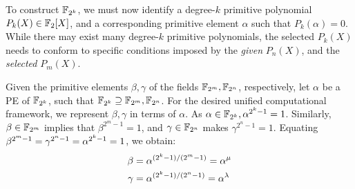 \par To construct ${\mathbb{F}}_{2^k}$, we must now identify
a degree-$k$ primitive polynomial $P_{k}(X)\in{\mathbb{F}}_2[X]$, and a
corresponding primitive element $\alpha$ such that
$P_k(\alpha)=0$. While there may exist many degree-$k$ primitive
polynomials, the selected $P_k(X)$ needs to conform to specific
conditions imposed by the {\it given} $P_n(X)$, and
the {\it selected} $P_m(X)$.





Given the primitive elements $\beta, \gamma$ of the fields 
${\mathbb{F}}_{2^m},{\mathbb{F}}_{2^n}$, respectively, let $\alpha$ be a PE of ${\mathbb{F}}_{2^k}$,
such that ${\mathbb{F}}_{2^k} \supseteq {\mathbb{F}}_{2^m},{\mathbb{F}}_{2^n}$. For the desired unified
computational framework, we represent $\beta, \gamma$ in terms
of $\alpha$. As $\alpha \in {\mathbb{F}}_{2^k}, \alpha^{2^k-1}=1$. Similarly,
$\beta\in {\mathbb{F}}_{2^m}$ implies that $\beta^{2^{m}-1}=1$, and $\gamma\in{\mathbb{F}}_{2^n}$
makes $\gamma^{2^n-1}=1$. Equating
$\beta^{2^m-1}=\gamma^{2^n-1}=\alpha^{2^k-1} = 1$, we obtain:
\begin{equation}\label{word-level-rep}
\begin{split}
 \be &= \al^{(2^k-1)/(2^m-1)} = \al^{\mu}\\
 \ga &= \al^{(2^k-1)/(2^n-1)} = \al^{\lambda}
 \end{split}
\end{equation}

